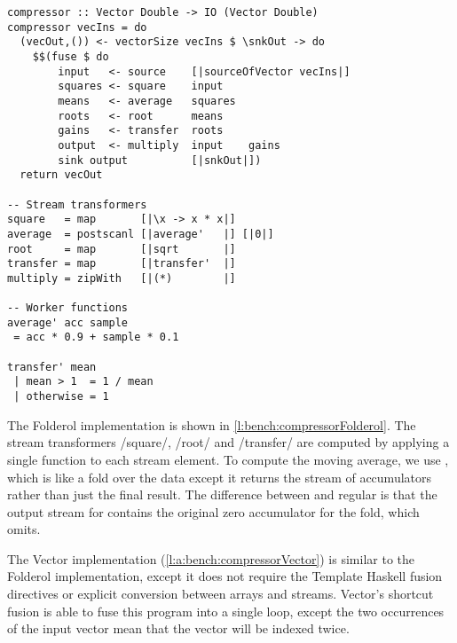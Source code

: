 \begin{lstlisting}[float,label=l:bench:compressorFolderol,caption=Folderol implementation of \Hs/compressor/]
compressor :: Vector Double -> IO (Vector Double)
compressor vecIns = do
  (vecOut,()) <- vectorSize vecIns $ \snkOut -> do
    $$(fuse $ do
        input   <- source    [|sourceOfVector vecIns|]
        squares <- square    input
        means   <- average   squares
        roots   <- root      means
        gains   <- transfer  roots
        output  <- multiply  input    gains
        sink output          [|snkOut|])
  return vecOut

-- Stream transformers
square   = map       [|\x -> x * x|]
average  = postscanl [|average'   |] [|0|]
root     = map       [|sqrt       |]
transfer = map       [|transfer'  |]
multiply = zipWith   [|(*)        |]

-- Worker functions
average' acc sample
 = acc * 0.9 + sample * 0.1

transfer' mean
 | mean > 1  = 1 / mean
 | otherwise = 1
\end{lstlisting}

The Folderol implementation is shown in \cref{l:bench:compressorFolderol}.
The stream transformers \Hs/square/, \Hs/root/ and \Hs/transfer/ are computed by applying a single function to each stream element.
To compute the moving average, we use \Hs@postscanl@, which is like a fold over the data except it returns the stream of accumulators rather than just the final result.
The difference between \Hs@postscanl@ and regular \Hs@scanl@ is that the output stream for \Hs@scanl@ contains the original zero accumulator for the fold, which \Hs@postscanl@ omits.

The Vector implementation (\cref{l:a:bench:compressorVector}) is similar to the Folderol implementation, except it does not require the Template Haskell fusion directives or explicit conversion between arrays and streams.
Vector's shortcut fusion is able to fuse this program into a single loop, except the two occurrences of the input vector mean that the vector will be indexed twice.

